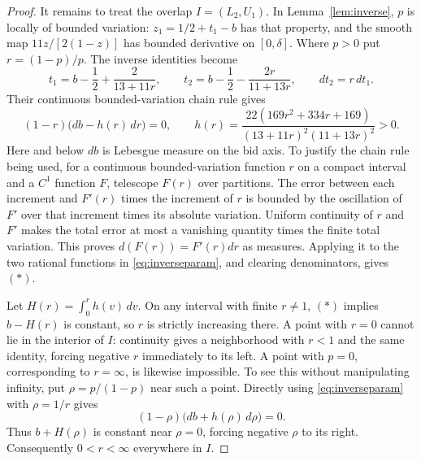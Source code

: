 \documentclass[11pt,a4paper]{article}
\theoremstyle{remark}\newtheorem{remark}[theorem]{Remark}
\begin{document}
\begin{proof}
It remains to treat the overlap $I=(L_2,U_1)$. In Lemma~\ref{lem:inverse}, $p$ is locally of bounded variation: $z_1=1/2+t_1-b$ has that property, and the smooth map $11z/[2(1-z)]$ has bounded derivative on $[0,\delta]$. Where $p>0$ put $r=(1-p)/p$. The inverse identities become
\begin{equation}\label{eq:inverseparam}
 t_1=b-\frac12+\frac{2}{13+11r},\qquad
 t_2=b-\frac12-\frac{2r}{11+13r},\qquad dt_2=r\,dt_1.
\end{equation}
Their continuous bounded-variation chain rule gives
\[
 (1-r)\bigl(db-h(r)\,dr\bigr)=0,
 \qquad
 h(r)=\frac{22(169r^2+334r+169)}{(13+11r)^2(11+13r)^2}>0.\tag{*}
\]
Here and below $db$ is Lebesgue measure on the bid axis. To justify the chain rule being used, for a continuous bounded-variation function $r$ on a compact interval and a $C^1$ function $F$, telescope $F(r)$ over partitions. The error between each increment and $F'(r)$ times the increment of $r$ is bounded by the oscillation of $F'$ over that increment times its absolute variation. Uniform continuity of $r$ and $F'$ makes the total error at most a vanishing quantity times the finite total variation. This proves $d(F(r))=F'(r)dr$ as measures. Applying it to the two rational functions in \eqref{eq:inverseparam}, and clearing denominators, gives $(*)$.

Let $H(r)=\int_0^r h(v)\,dv$. On any interval with finite $r\ne1$, $(*)$ implies $b-H(r)$ is constant, so $r$ is strictly increasing there. A point with $r=0$ cannot lie in the interior of $I$: continuity gives a neighborhood with $r<1$ and the same identity, forcing negative $r$ immediately to its left. A point with $p=0$, corresponding to $r=\infty$, is likewise impossible. To see this without manipulating infinity, put $\rho=p/(1-p)$ near such a point. Directly using \eqref{eq:inverseparam} with $\rho=1/r$ gives
\[
 (1-\rho)\bigl(db+h(\rho)\,d\rho\bigr)=0.
\]
Thus $b+H(\rho)$ is constant near $\rho=0$, forcing negative $\rho$ to its right. Consequently $0<r<\infty$ everywhere in $I$.


\end{proof}
\end{document}
